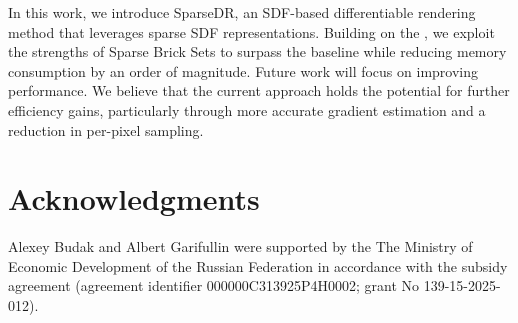 \documentclass{article}
\begin{document}
In this work, we introduce SparseDR, an SDF-based differentiable rendering method that leverages sparse SDF representations. Building on the \cite{DRSDF24}, we exploit the strengths of Sparse Brick Sets to surpass the baseline while reducing memory consumption by an order of magnitude. Future work will focus on improving performance. We believe that the current approach holds the potential for further efficiency gains, particularly through more accurate gradient estimation and a reduction in per-pixel sampling.

\section*{Acknowledgments}

Alexey Budak and Albert Garifullin were supported by the The Ministry of Economic Development of the Russian Federation in accordance with the subsidy agreement (agreement identifier 000000C313925P4H0002; grant No 139-15-2025-012).



\end{document}
